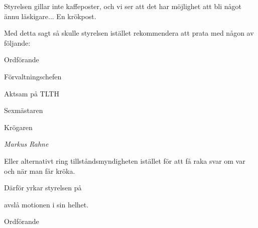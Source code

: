 \documentclass[../_main/handlingar.tex]{subfiles}
\begin{document}
\motionssvar

Styrelsen gillar inte kaffeposter, och vi ser att det har möjlighet att bli något ännu läskigare... En krökpost.

Med detta sagt så skulle styrelsen istället rekommendera att prata med någon av följande:
\begin{dashlist}
    \item Ordförande
    \item Förvaltningschefen
    \item Aktsam på TLTH
    \item Sexmästaren
    \item Krögaren
    \item \textit{Markus Rahne}
\end{dashlist}

Eller alternativt ring tillståndsmyndigheten istället för att få raka svar om var och när man får kröka.


Därför yrkar styrelsen på
\begin{attsatser}
    \att avslå motionen i sin helhet.
\end{attsatser}

\begin{signatures}{1}
    \ist
    \signature{\ordf}{Ordförande}
\end{signatures}
\end{document}
